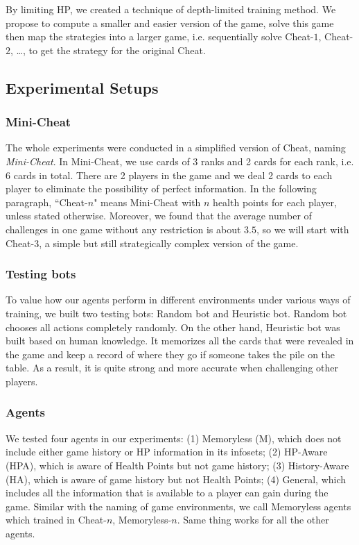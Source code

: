 \documentclass[runningheads]{llncs}
\begin{document}
    By limiting HP, we created a technique of depth-limited training method. We propose to compute a smaller and easier version of the game, solve this game then map the strategies into a larger game, i.e. sequentially solve Cheat-$1$, Cheat-$2$, \dots, to get the strategy for the original Cheat. 

\subsection{Experimental Setups}
    \subsubsection{Mini-Cheat}
    The whole experiments were conducted in a simplified version of Cheat, naming \textit{Mini-Cheat}. In Mini-Cheat, we use cards of 3 ranks and 2 cards for each rank, i.e. 6 cards in total. There are 2 players in the game and we deal 2 cards to each player to eliminate the possibility of perfect information. In the following paragraph, ``Cheat-$n$" means Mini-Cheat with $n$ health points for each player, unless stated otherwise. Moreover, we found that the average number of challenges in one game without any restriction is about $3.5$, so we will start with Cheat-$3$, a simple but still strategically complex version of the game.
    
    \subsubsection{Testing bots}
    To value how our agents perform in different environments under various ways of training, we built two testing bots: Random bot and Heuristic bot. Random bot chooses all actions completely randomly. On the other hand, Heuristic bot was built based on human knowledge. It memorizes all the cards that were revealed in the game and keep a record of where they go if someone takes the pile on the table. As a result, it is quite strong and more accurate when challenging other players.
    
    \subsubsection{Agents}
    We tested four agents in our experiments: (1) Memoryless (M), which does not include either game history or HP information in its infosets; (2) HP-Aware (HPA), which is aware of Health Points but not game history; (3) History-Aware (HA), which is aware of game history but not Health Points; (4) General, which includes all the information that is available to a player can gain during the game. Similar with the naming of game environments, we call Memoryless agents which trained in Cheat-$n$, Memoryless-$n$. Same thing works for all the other agents.
\end{document}
